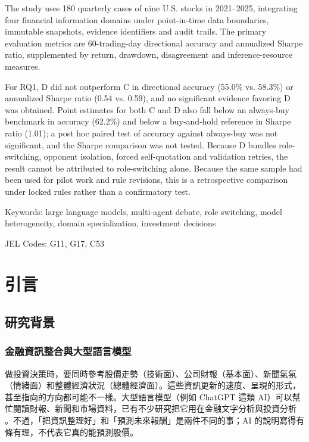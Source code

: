 \documentclass[12pt,a4paper]{article}
\numberwithin{table}{section}
\numberwithin{figure}{section}
\begin{document}
The study uses 180 quarterly cases of nine U.S. stocks in 2021--2025, integrating four financial information domains under point-in-time data boundaries, immutable snapshots, evidence identifiers and audit trails. The primary evaluation metrics are 60-trading-day directional accuracy and annualized Sharpe ratio, supplemented by return, drawdown, disagreement and inference-resource measures.

For RQ1, D did not outperform C in directional accuracy (55.0\% vs. 58.3\%) or annualized Sharpe ratio (0.54 vs. 0.59), and no significant evidence favoring D was obtained. Point estimates for both C and D also fall below an always-buy benchmark in accuracy (62.2\%) and below a buy-and-hold reference in Sharpe ratio (1.01); a post hoc paired test of accuracy against always-buy was not significant, and the Sharpe comparison was not tested. Because D bundles role-switching, opponent isolation, forced self-quotation and validation retries, the result cannot be attributed to role-switching alone. Because the same sample had been used for pilot work and rule revisions, this is a retrospective comparison under locked rules rather than a confirmatory test.

\vspace{0.6cm}
\noindent Keywords: large language models, multi-agent debate, role switching, model heterogeneity, domain specialization, investment decisions

\noindent JEL Codes: G11, G17, C53
\clearpage
\tableofcontents
\clearpage
\listoftables
\clearpage
\listoffigures
\clearpage
{}

\clearpage\section{引言}

\subsection{研究背景}

\subsubsection{金融資訊整合與大型語言模型}
做投資決策時，要同時參考股價走勢（技術面）、公司財報（基本面）、新聞氣氛（情緒面）和整體經濟狀況（總體經濟面）。這些資訊更新的速度、呈現的形式，甚至指向的方向都可能不一樣。大型語言模型（例如 ChatGPT 這類 AI）可以幫忙閱讀財報、新聞和市場資料，已有不少研究把它用在金融文字分析與投資分析 \citep{lopezlira2023chatgpt,araci2019finbert,liu2023fingpt}。不過，「把資訊整理好」和「預測未來報酬」是兩件不同的事；AI 的說明寫得有條有理，不代表它真的能預測股價。
\end{document}
